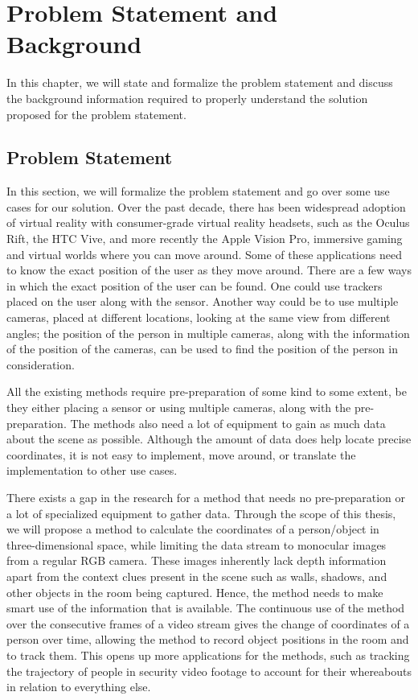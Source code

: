 \chapter{Problem Statement and Background}

In this chapter, we will state and formalize the problem statement and discuss the background information required to properly understand the solution proposed for the problem statement.

\section{Problem Statement}

In this section, we will formalize the problem statement and go over some use cases for our solution. Over the past decade, there has been widespread adoption of virtual reality with consumer-grade virtual reality headsets, such as the Oculus Rift, the HTC Vive, and more recently the Apple Vision Pro, immersive gaming and virtual worlds where you can move around. Some of these applications need to know the exact position of the user as they move around. There are a few ways in which the exact position of the user can be found. One could use trackers placed on the user along with the sensor. Another way could be to use multiple cameras, placed at different locations, looking at the same view from different angles; the position of the person in multiple cameras, along with the information of the position of the cameras, can be used to find the position of the person in consideration.\newline

All the existing methods require pre-preparation of some kind to some extent, be they either placing a sensor or using multiple cameras, along with the pre-preparation. The methods also need a lot of equipment to gain as much data about the scene as possible. Although the amount of data does help locate precise coordinates, it is not easy to implement, move around, or translate the implementation to other use cases.\newline

There exists a gap in the research for a method that needs no pre-preparation or a lot of specialized equipment to gather data. Through the scope of this thesis, we will propose a method to calculate the coordinates of a person/object in three-dimensional space, while limiting the data stream to monocular images from a regular RGB camera. These images inherently lack depth information apart from the context clues present in the scene such as walls, shadows, and other objects in the room being captured. Hence, the method needs to make smart use of the information that is available. The continuous use of the method over the consecutive frames of a video stream gives the change of coordinates of a person over time, allowing the method to record object positions in the room and to track them. This opens up more applications for the methods, such as tracking the trajectory of people in security video footage to account for their whereabouts in relation to everything else.

